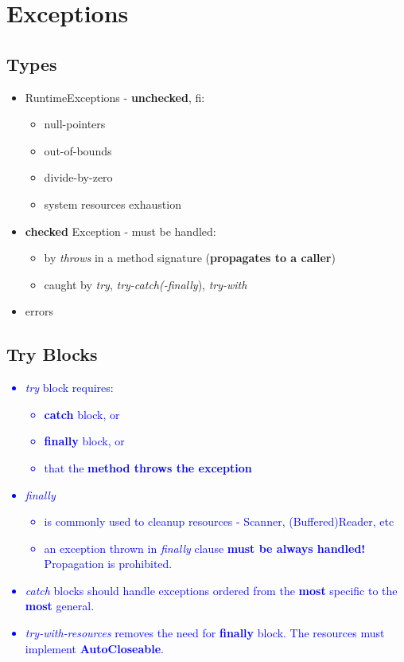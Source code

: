 \documentclass{report}
\begin{document}
\chapter{Exceptions}
\section{Types}
\begin{itemize}
	\item RuntimeExceptions - \textbf{unchecked}, fi:
	\begin{itemize}
		\item null-pointers
		\item out-of-bounds
		\item divide-by-zero
		\item system resources exhaustion
	\end{itemize}
	\item \textbf{checked} Exception - must be handled:
	\begin{itemize}
		\item by \textit{throws} in a method signature (\textbf{propagates to a caller})
		\item caught by \textit{try}, \textit{try-catch(-finally}), \textit{try-with} 
	\end{itemize}
	\item errors
\end{itemize}

\section{Try Blocks}
\textcolor{blue}{
	\begin{itemize}
		\item \textit{try} block requires:
			\begin{itemize}
				\item \textbf{catch} block, or
				\item \textbf{finally} block, or
				\item that the \textbf{method throws the exception}
			\end{itemize}
		\item \textit{finally} 
		\begin{itemize}
			\item is commonly used to cleanup resources - Scanner, (Buffered)Reader, etc
			\item an exception thrown in \textit{finally} clause \textbf{must be always handled!} Propagation is prohibited.
		\end{itemize}
		\item \textit{catch} blocks should handle exceptions ordered from the \textbf{most} specific to the \textbf{most }general.
		\item \textit{try-with-resources} removes the need for \textbf{finally} block. The resources must implement \textbf{AutoCloseable}.
	\end{itemize}
}
\end{document}
